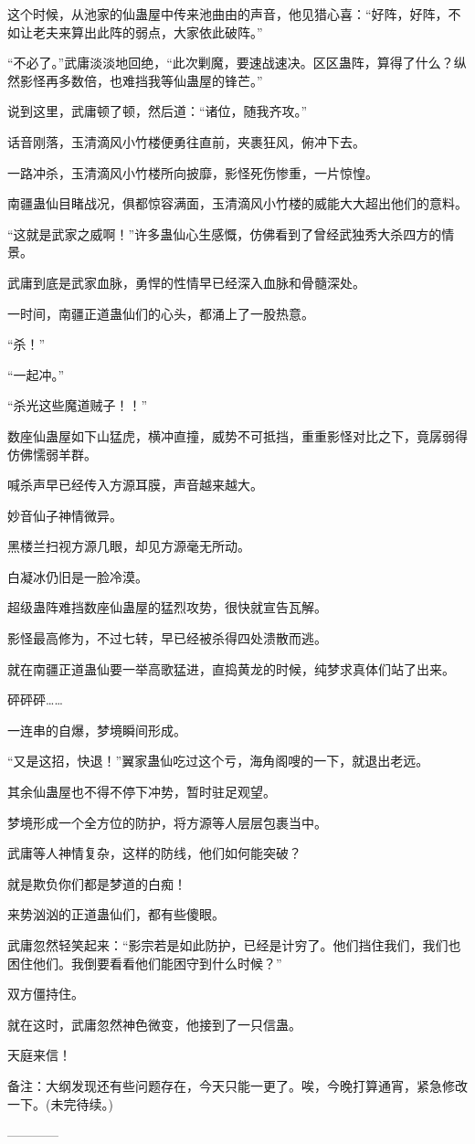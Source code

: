 \begin{this_body}
这个时候，从池家的仙蛊屋中传来池曲由的声音，他见猎心喜：“好阵，好阵，不如让老夫来算出此阵的弱点，大家依此破阵。”

“不必了。”武庸淡淡地回绝，“此次剿魔，要速战速决。区区蛊阵，算得了什么？纵然影怪再多数倍，也难挡我等仙蛊屋的锋芒。”

说到这里，武庸顿了顿，然后道：“诸位，随我齐攻。”

话音刚落，玉清滴风小竹楼便勇往直前，夹裹狂风，俯冲下去。

一路冲杀，玉清滴风小竹楼所向披靡，影怪死伤惨重，一片惊惶。

南疆蛊仙目睹战况，俱都惊容满面，玉清滴风小竹楼的威能大大超出他们的意料。

“这就是武家之威啊！”许多蛊仙心生感慨，仿佛看到了曾经武独秀大杀四方的情景。

武庸到底是武家血脉，勇悍的性情早已经深入血脉和骨髓深处。

一时间，南疆正道蛊仙们的心头，都涌上了一股热意。

“杀！”

“一起冲。”

“杀光这些魔道贼子！！”

数座仙蛊屋如下山猛虎，横冲直撞，威势不可抵挡，重重影怪对比之下，竟孱弱得仿佛懦弱羊群。

喊杀声早已经传入方源耳膜，声音越来越大。

妙音仙子神情微异。

黑楼兰扫视方源几眼，却见方源毫无所动。

白凝冰仍旧是一脸冷漠。

超级蛊阵难挡数座仙蛊屋的猛烈攻势，很快就宣告瓦解。

影怪最高修为，不过七转，早已经被杀得四处溃散而逃。

就在南疆正道蛊仙要一举高歌猛进，直捣黄龙的时候，纯梦求真体们站了出来。

砰砰砰……

一连串的自爆，梦境瞬间形成。

“又是这招，快退！”翼家蛊仙吃过这个亏，海角阁嗖的一下，就退出老远。

其余仙蛊屋也不得不停下冲势，暂时驻足观望。

梦境形成一个全方位的防护，将方源等人层层包裹当中。

武庸等人神情复杂，这样的防线，他们如何能突破？

就是欺负你们都是梦道的白痴！

来势汹汹的正道蛊仙们，都有些傻眼。

武庸忽然轻笑起来：“影宗若是如此防护，已经是计穷了。他们挡住我们，我们也困住他们。我倒要看看他们能困守到什么时候？”

双方僵持住。

就在这时，武庸忽然神色微变，他接到了一只信蛊。

天庭来信！

备注：大纲发现还有些问题存在，今天只能一更了。唉，今晚打算通宵，紧急修改一下。(未完待续。)

------------

\end{this_body}

